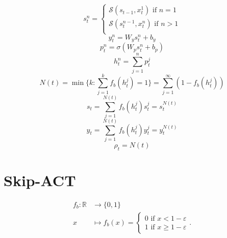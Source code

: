 \documentclass[12pt]{article}
\def\RR{\mathbb R}   %
\def\vepsilon{\varepsilon}   %
\begin{document}
\begin{equation}
s_t^n = 
\begin{cases}
\mathcal{S}(s_{t-1}, x_t^1) \text{ if } n = 1\\
\mathcal{S}(s_t^{n-1}, x_t^n) \text{ if } n > 1\\
\end{cases}
\end{equation}
\begin{equation}
y_t^n = W_y s_t^n + b_y
\end{equation}
\begin{equation}
p_t^n = \sigma(W_p s_t^n + b_p)
\end{equation}
\begin{equation}
h_t^n = \sum_{j=1}^np_t^j
\end{equation}
\begin{equation}
N(t) = \min\{k:\sum_{j=1}^k f_b(h_t^j)=1\}=\sum_{j=1}^\infty (1-f_b(h_t^j))
\end{equation}
\begin{equation}
s_t = \sum_{j=1}^{N(t)}f_b(h_t^j) s_t^j = s_t^{N(t)}
\end{equation}
\begin{equation}
y_t = \sum_{j=1}^{N(t)}f_b(h_t^j) y_t^j = y_t^{N(t)}
\end{equation}
\begin{equation}
\rho_t = N(t)
\end{equation}
\newpage
\section{Skip-ACT}

\begin{align}
f_b \colon \RR &\to \{0, 1\}\\
x &\mapsto f_b(x) = \begin{cases}
0 \text{ if } x<1-\vepsilon\\
1 \text{ if } x \ge 1-\vepsilon
\end{cases}.
\end{align}
\end{document}
